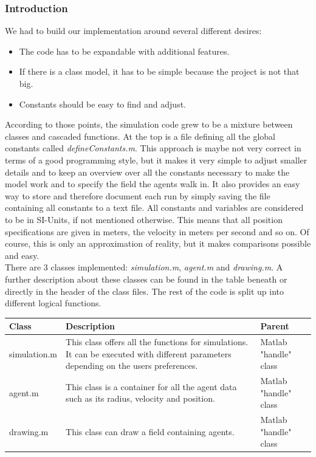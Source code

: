 
\subsubsection{Introduction}
We had to build our implementation around several different desires:

\begin{itemize}
\item The code has to be expandable with additional features.
\item If there is a class model, it has to be simple because the project is not that big.
\item Constants should be easy to find and adjust.
\end{itemize}

\noi According to those points, the simulation code grew to be a mixture between classes and cascaded functions. At the top is a file defining all the global constants called  \textit{defineConstants.m}. This approach is maybe not very correct in terms of a good programming style, but it makes it very simple to adjust smaller details and to keep an overview over all the constants necessary to make the model work and to specify the field the agents walk in. It also provides an easy way to store and therefore document each run by simply saving the file containing all constants to a text file. All constants and variables are considered to be in SI-Units, if not mentioned otherwise. This means that all position specifications are given in meters, the velocity in meters per second and so on. Of course, this is only an approximation of reality, but it makes comparisons possible and easy.\\

\noi There are 3 classes implemented: \textit{simulation.m}, \textit{agent.m} and \textit{drawing.m}. A further description about these classes can be found in the table beneath or directly in the header of the class files. The rest of the code is split up into different logical functions.\\
\begin{tabular}{|l|p{7cm}|l|}
        \hline
        Class & Description & Parent \\ \hline
        simulation.m
		& This class offers all the functions for simulations. It can be executed  
		with different parameters depending on the users preferences.           
		& Matlab "handle" class \\ \hline
		agent.m    
		& This class is a container for all the agent data such as its radius, velocity and 
		position.   
		& Matlab "handle" class \\ \hline
		drawing.m
		& This class can draw a field containing agents.           
		& Matlab "handle" class \\  \hline
\end{tabular}\\

